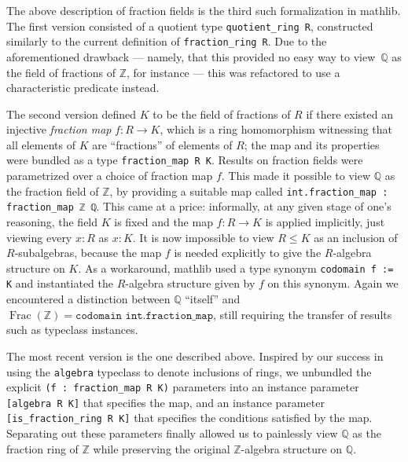 \documentclass[sn-mathphys]{sn-jnl}%
\newcommand{\lean}[1]{\texttt{#1}\xspace}
\newcommand{\mathlib}{\textsf{mathlib}\xspace}
\newcommand{\QQ}{\mathbb{Q}}
\renewcommand{\Z}{\mathbb{Z}}
\DeclareMathOperator{\Frac}{Frac}
\begin{document}
The above description of fraction fields is the third such formalization in \mathlib. The first version
consisted of a quotient type \lean{quotient\_ring R},
constructed similarly to the current definition of \lean{fraction\_ring R}.
Due to the aforementioned drawback --- namely, that this provided no easy way to view~$\QQ$ as the field of fractions of $\Z$, for instance ---
this was refactored to use a characteristic predicate instead.

The second version
defined $K$ to be the field of fractions of $R$ if there existed an injective \emph{fraction map} $f : R \to K$, which is a ring homomorphism witnessing that all elements of $K$ are ``fractions'' of elements of $R$;
the map and its properties were bundled as a type \lean{fraction\_map R K}.
Results on fraction fields were parametrized over a choice of fraction map $f$.
This made it possible to view $\QQ$ as the fraction field of $\Z$, by providing a suitable map called \lean{int.fraction\_map : fraction\_map ℤ ℚ}.
This came at a price:
informally, at any given stage of one's reasoning, the field $K$ is fixed and the map $f\colon R\to K$ is applied implicitly, just viewing every $x:R$ as $x:K$.
It is now impossible to view $R \leq K$ as an inclusion of $R$-subalgebras,
because the map $f$ is needed explicitly to give the $R$-algebra structure on $K$.
As a workaround, \mathlib used a type synonym \lean{codomain f := K} and instantiated the $R$-algebra structure given by $f$ on this synonym.
Again we encountered a distinction between $\QQ$ ``itself'' and $\Frac(\Z) = \lean{codomain int.fraction\_map}$,
still requiring the transfer of results such as typeclass instances.

The most recent version is the one described above.
Inspired by our success in using the \lean{algebra} typeclass to denote inclusions of rings,
we unbundled the explicit \lean{(f : fraction\_map R K)} parameters into
an instance parameter \lean{[algebra R K]} that specifies the map,
and an instance parameter \lean{[is\_fraction\_ring R K]} that specifies the conditions satisfied by the map.
Separating out these parameters finally allowed us to painlessly view $\QQ$ as the fraction ring of $\Z$ while preserving the original $\Z$-algebra structure on $\QQ$.
\end{document}
